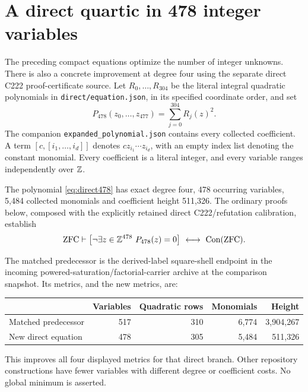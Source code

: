 \section{A direct quartic in 478 integer variables}
\label{sec:direct478}

The preceding compact equations optimize the number of integer unknowns.
There is also a concrete improvement at degree four using the separate
direct C222 proof-certificate source.  Let $R_0,\ldots,R_{304}$ be the
literal integral quadratic polynomials in
\texttt{direct/equation.json}, in its specified coordinate order, and set
\begin{equation}\label{eq:direct478}
 \boxed{P_{478}(z_0,\ldots,z_{477})=\sum_{j=0}^{304}R_j(z)^2.}
\end{equation}
The companion \texttt{expanded\_polynomial.json} contains every collected
coefficient.  A term $[c,[i_1,\ldots,i_d]]$ denotes
$cz_{i_1}\cdots z_{i_d}$, with an empty index list denoting the constant
monomial.  Every coefficient is a literal integer, and every variable
ranges independently over $\mathbb Z$.

\begin{theorem}\label{thm:direct478}
The polynomial \eqref{eq:direct478} has exact degree four, 478 occurring
variables, 5,484 collected monomials and coefficient height 511,326.
The ordinary proofs below, composed with the explicitly retained direct
C222/refutation calibration, establish
\[
 \mathrm{ZFC}\vdash
 \bigl[\neg\exists z\in\mathbb Z^{478}\ P_{478}(z)=0\bigr]
 \ \longleftrightarrow\ \operatorname{Con}(\mathrm{ZFC}).
\]
\end{theorem}

The matched predecessor is the derived-label square-shell endpoint in the
incoming powered-saturation/factorial-carrier archive at the comparison
snapshot.  Its metrics, and the new metrics, are:
\begin{center}
\begin{tabular}{lrrrr}
 & Variables & Quadratic rows & Monomials & Height\\
\hline
Matched predecessor & 517 & 310 & 6,774 & 3,904,267\\
New direct equation & 478 & 305 & 5,484 & 511,326
\end{tabular}
\end{center}
This improves all four displayed metrics for that direct branch.  Other
repository constructions have fewer variables with different degree or
coefficient costs.  No global minimum is asserted.

